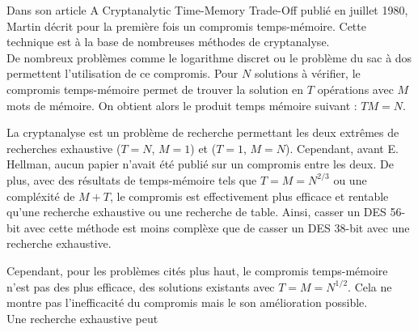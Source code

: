 
	Dans son article \og{}A Cryptanalytic Time-Memory Trade-Off\fg{}\cite{ehellman} publié en juillet 1980, Martin  décrit pour la première fois un compromis temps-mémoire. Cette technique est à la base de nombreuses méthodes de cryptanalyse.\\

	De nombreux problèmes comme le logarithme discret ou le problème du sac à dos permettent l'utilisation de ce compromis. Pour $N$ solutions à vérifier, le compromis temps-mémoire permet de trouver la solution en $T$ opérations avec $M$ mots de mémoire. On obtient alors le produit temps mémoire suivant : $TM = N$.

	La cryptanalyse est un problème de recherche permettant les deux extrêmes de recherches exhaustive ($T=N$, $M=1$) et ($T=1$, $M=N$). Cependant, avant E. Hellman\cite{ehellman}, aucun papier n'avait été publié sur un compromis entre les deux. De plus, avec des résultats de temps-mémoire tels que $T = M = N^{2/3}$ ou une compléxité de $M + T$, le compromis est effectivement plus efficace et rentable qu'une recherche exhaustive ou une recherche de table. Ainsi, casser un DES 56-bit avec cette méthode est moins complèxe que de casser un DES 38-bit avec une recherche exhaustive.

	Cependant, pour les problèmes cités plus haut, le compromis temps-mémoire n'est pas des plus efficace, des solutions existants avec $T = M = N^{1/2}$. Cela ne montre pas l'inefficacité du compromis mais le son amélioration possible.\\

	Une recherche exhaustive peut

\endinput{}
